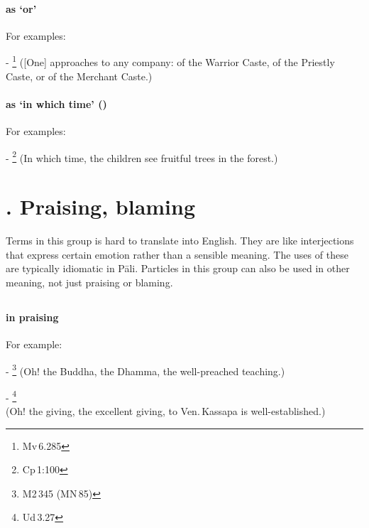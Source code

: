 \paragraph*{ as `or'} For examples:\par
- \footnote{Mv\,6.285} ([One] approaches to any company: of the Warrior Caste, of the Priestly Caste, or of the Merchant Caste.) \par
\paragraph*{ as `in which time' ()} For examples:\par
- \footnote{Cp\,1:100} (In which time, the children see fruitful trees in the forest.) \par

\label{nipgrp13}
\section*{. Praising, blaming}

Terms in this group is hard to translate into English. They are like interjections that express certain emotion rather than a sensible meaning. The uses of these are typically idiomatic in P\=ali. Particles in this group can also be used in other meaning, not just praising or blaming.

\subsection*{}\label{nip:aho}
\paragraph*{ in praising} For example:\par
- \footnote{M2\,345 (MN\,85)} (Oh! the Buddha, the Dhamma, the well-preached teaching.) \par
- \footnote{Ud\,3.27} \\(Oh! the giving, the excellent giving, to Ven.\,Kassapa is well-established.) \par
